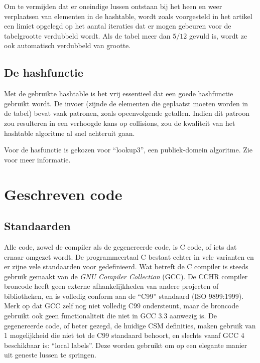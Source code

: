 Om te vermijden dat er oneindige lussen ontstaan bij het heen en weer verplaatsen van elementen in de hashtable, wordt zoals voorgesteld in het artikel een limiet opgelegd op het aantal iteraties dat er mogen gebeuren voor de tabelgrootte verdubbeld wordt. Als de tabel meer dan $5/12$ gevuld is, wordt ze ook automatisch verdubbeld van grootte.

\subsection{De hashfunctie} \label{sec:hashfunc}

Met de gebruikte hashtable is het vrij essentieel dat een goede hashfunctie gebruikt wordt. De invoer (zijnde de elementen die geplaatst moeten worden in de tabel) bevat vaak patronen, zoals opeenvolgende getallen. Indien dit patroon zou resulteren in een verhoogde kans op collisions, zou de kwaliteit van het hashtable algoritme al snel achteruit gaan.

Voor de hasfunctie is gekozen voor ``lookup3'', een publiek-domein algoritme. Zie \cite{hashing} voor meer informatie.

\section{Geschreven code} \label{sec:correctheid}

\subsection{Standaarden} \label{sec:standards}

Alle code, zowel de compiler als de gegenereerde code, is C code, of iets dat ernaar omgezet wordt. De programmeertaal C bestaat echter in vele varianten en er zijne vele standaarden voor gedefinieerd. Wat betreft de C compiler is steeds gebruik gemaakt van de {\em GNU Compiler Collection} (GCC). De CCHR compiler broncode heeft geen externe afhankelijkheden van andere projecten of bibliotheken, en is volledig conform aan de ``C99'' standaard (ISO 9899:1999). Merk op dat GCC zelf nog niet volledig C99 ondersteunt, maar de broncode gebruikt ook geen functionaliteit die niet in GCC 3.3 aanwezig is. De gegenereerde code, of beter gezegd, de huidige CSM definities, maken gebruik van 1 mogelijkheid die niet tot de C99 standaard behoort, en slechts vanaf GCC 4 beschikbaar is: ``local labels''. Deze worden gebruikt om op een elegante manier uit geneste lussen te springen.

